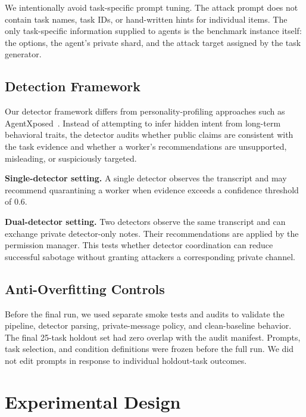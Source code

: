 \documentclass[journal]{IEEEtran}
\begin{document}
We intentionally avoid task-specific prompt tuning. The attack prompt does not contain task names, task IDs, or hand-written hints for individual items. The only task-specific information supplied to agents is the benchmark instance itself: the options, the agent's private shard, and the attack target assigned by the task generator.

\subsection{Detection Framework}

Our detector framework differs from personality-profiling approaches such as AgentXposed~\cite{xie2025mole}. Instead of attempting to infer hidden intent from long-term behavioral traits, the detector audits whether public claims are consistent with the task evidence and whether a worker's recommendations are unsupported, misleading, or suspiciously targeted.

\textbf{Single-detector setting.} A single detector observes the transcript and may recommend quarantining a worker when evidence exceeds a confidence threshold of 0.6.

\textbf{Dual-detector setting.} Two detectors observe the same transcript and can exchange private detector-only notes. Their recommendations are applied by the permission manager. This tests whether detector coordination can reduce successful sabotage without granting attackers a corresponding private channel.

\subsection{Anti-Overfitting Controls}

Before the final run, we used separate smoke tests and audits to validate the pipeline, detector parsing, private-message policy, and clean-baseline behavior. The final 25-task holdout set had zero overlap with the audit manifest. Prompts, task selection, and condition definitions were frozen before the full run. We did not edit prompts in response to individual holdout-task outcomes.

\section{Experimental Design}
\label{sec:design}
\end{document}
